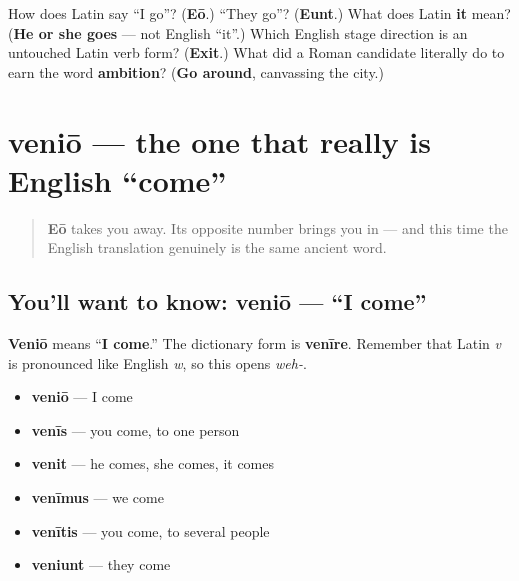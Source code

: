 \begin{tcolorbox}[breakable,colback=teal!4,colframe=teal!35!black,title={Before you move on}]
How does Latin say \textquotedblleft{}I go\textquotedblright{}? (\textbf{Eō}.) \textquotedblleft{}They go\textquotedblright{}? (\textbf{Eunt}.) What does Latin \textbf{it} mean? (\textbf{He or she goes} — not English \textquotedblleft{}it\textquotedblright{}.) Which English stage direction is an untouched Latin verb form? (\textbf{Exit}.) What did a Roman candidate literally do to earn the word \textbf{ambition}? (\textbf{Go around}, canvassing the city.)
\end{tcolorbox}
\section[veniō, venīre]{veniō — the one that really is English \textquotedblleft{}come\textquotedblright{}}

\label{lesson:LA-C37-venio}



\begin{quote}
\textbf{Eō} takes you away. Its opposite number brings you in — and this time the English translation genuinely is the same ancient word.
\end{quote}

\subsection*{You'll want to know: veniō — \textquotedblleft{}I come\textquotedblright{}}
\textbf{Veniō} means \textquotedblleft{}\textbf{I come}.\textquotedblright{} The dictionary form is \textbf{venīre}. Remember that Latin \emph{v} is pronounced like English \emph{w}, so this opens \emph{weh-}.

\begin{itemize}
\raggedright
  \item \textbf{veniō} — I come
  \item \textbf{venīs} — you come, to one person
  \item \textbf{venit} — he comes, she comes, it comes
  \item \textbf{venīmus} — we come
  \item \textbf{venītis} — you come, to several people
  \item \textbf{veniunt} — they come
\end{itemize}

